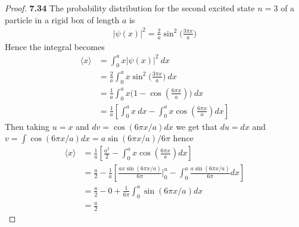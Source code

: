 \documentclass[11pt]{article}
\theoremstyle{definition}
\begin{document}
\cleardoublepage
\begin{proof}{\textbf{7.34}}
The probability distribution for the second excited state
$n = 3$ of a particle in a rigid box of length $a$ is 
\begin{align*}
    |\psi(x)|^2 = \frac{2}{a}\sin^2\bigg(\frac{3\pi x}{a}\bigg)
\end{align*}
Hence the integral becomes
\begin{align*}
    \langle x\rangle &= \int_{0}^a x|\psi(x)|^2~dx\\
    &= \frac{2}{a}\int_{0}^a x\sin^2\bigg(\frac{3\pi x}{a}\bigg)~dx\\
    &= \frac{1}{a}\int_{0}^a x\bigg(1 - \cos(\frac{6\pi x}{a})\bigg)~dx\\
    &= \frac{1}{a}\left[\int_{0}^a x~dx - \int_{0}^a x\cos(\frac{6\pi x}{a})dx\right]
\end{align*}
Then taking $u = x$ and $dv = \cos(6\pi x/a) dx$ we get that
$du = dx$ and $v = \int \cos(6\pi x/a) dx = a\sin(6\pi x/a)/6\pi$ hence
\begin{align*}
    \langle x\rangle &= \frac{1}{a}\left[\frac{a^2}{2} 
    - \int_{0}^a x\cos(\frac{6\pi x}{a})dx\right]\\
    &= \frac{a}{2}
    - \frac{1}{a}\left[\frac{ax\sin(6\pi x/a)}{6\pi}\bigg|_0^a
    - \int_{0}^a \frac{a\sin(6\pi x/a)}{6\pi} dx\right]\\
    &= \frac{a}{2} - 0 + \frac{1}{6\pi}\int_{0}^a \sin(6\pi x/a) dx\\
    &= \frac{a}{2}
\end{align*}
\end{proof}
\end{document}
